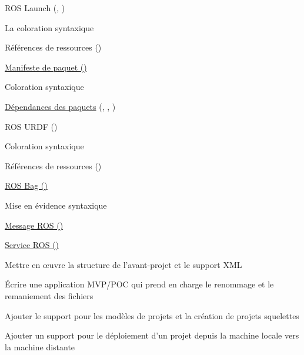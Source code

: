 \begin{multicols}{2}
\begin{todolist}
\item[\done] ROS Launch (\href{https://wiki.ros.org/roslaunch/XML}{}, \href{https://wiki.ros.org/rostest/Writing}{})
\begin{todolist}
\item[\done] La coloration syntaxique
\item[\done] Références de ressources ()
\end{todolist}
\item[\done] \href{https://wiki.ros.org/Manifest}{Manifeste de paquet ()}
\begin{todolist}
\item[\done] Coloration syntaxique
\item[\done] \href{https://wiki.ros.org/catkin/package.xml#Dependencies}{Dépendances des paquets} (, , )
\end{todolist}
\item[\done] ROS URDF ()
\begin{todolist}
\item[\done] Coloration syntaxique
\item[\done] Références de ressources ()
\end{todolist}
\item[\done] \href{https://wiki.ros.org/Bags/Format}{ROS Bag ()}
\begin{todolist}
\item[\done] Mise en évidence syntaxique
\end{todolist}
\item[\done] \href{https://wiki.ros.org/msg}{Message ROS ()}
\item[\done] \href{https://wiki.ros.org/srv}{Service ROS ()}
\item[\done] Mettre en œuvre la structure de l'avant-projet et le support XML
\item[\done] Écrire une application MVP/POC qui prend en charge le renommage et le remaniement des fichiers
\item[\done] Ajouter le support pour les modèles de projets et la création de projets squelettes
\item[\done] Ajouter un support pour le déploiement d'un projet depuis la machine locale vers la machine distante

\end{todolist}
\end{multicols}
